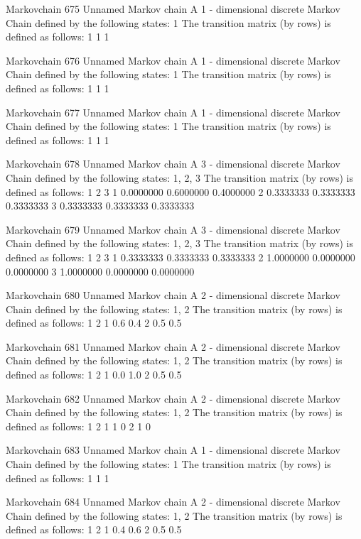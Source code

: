 \documentclass[
  nojss]{jss}
\begin{document}
\begin{CodeChunk}
\begin{CodeOutput}
Markovchain  675 
Unnamed Markov chain 
 A  1 - dimensional discrete Markov Chain defined by the following states: 
 1 
 The transition matrix  (by rows)  is defined as follows: 
  1
1 1

Markovchain  676 
Unnamed Markov chain 
 A  1 - dimensional discrete Markov Chain defined by the following states: 
 1 
 The transition matrix  (by rows)  is defined as follows: 
  1
1 1

Markovchain  677 
Unnamed Markov chain 
 A  1 - dimensional discrete Markov Chain defined by the following states: 
 1 
 The transition matrix  (by rows)  is defined as follows: 
  1
1 1

Markovchain  678 
Unnamed Markov chain 
 A  3 - dimensional discrete Markov Chain defined by the following states: 
 1, 2, 3 
 The transition matrix  (by rows)  is defined as follows: 
          1         2         3
1 0.0000000 0.6000000 0.4000000
2 0.3333333 0.3333333 0.3333333
3 0.3333333 0.3333333 0.3333333

Markovchain  679 
Unnamed Markov chain 
 A  3 - dimensional discrete Markov Chain defined by the following states: 
 1, 2, 3 
 The transition matrix  (by rows)  is defined as follows: 
          1         2         3
1 0.3333333 0.3333333 0.3333333
2 1.0000000 0.0000000 0.0000000
3 1.0000000 0.0000000 0.0000000

Markovchain  680 
Unnamed Markov chain 
 A  2 - dimensional discrete Markov Chain defined by the following states: 
 1, 2 
 The transition matrix  (by rows)  is defined as follows: 
    1   2
1 0.6 0.4
2 0.5 0.5

Markovchain  681 
Unnamed Markov chain 
 A  2 - dimensional discrete Markov Chain defined by the following states: 
 1, 2 
 The transition matrix  (by rows)  is defined as follows: 
    1   2
1 0.0 1.0
2 0.5 0.5

Markovchain  682 
Unnamed Markov chain 
 A  2 - dimensional discrete Markov Chain defined by the following states: 
 1, 2 
 The transition matrix  (by rows)  is defined as follows: 
  1 2
1 1 0
2 1 0

Markovchain  683 
Unnamed Markov chain 
 A  1 - dimensional discrete Markov Chain defined by the following states: 
 1 
 The transition matrix  (by rows)  is defined as follows: 
  1
1 1

Markovchain  684 
Unnamed Markov chain 
 A  2 - dimensional discrete Markov Chain defined by the following states: 
 1, 2 
 The transition matrix  (by rows)  is defined as follows: 
    1   2
1 0.4 0.6
2 0.5 0.5


\end{CodeOutput}
\end{CodeChunk}
\end{document}

